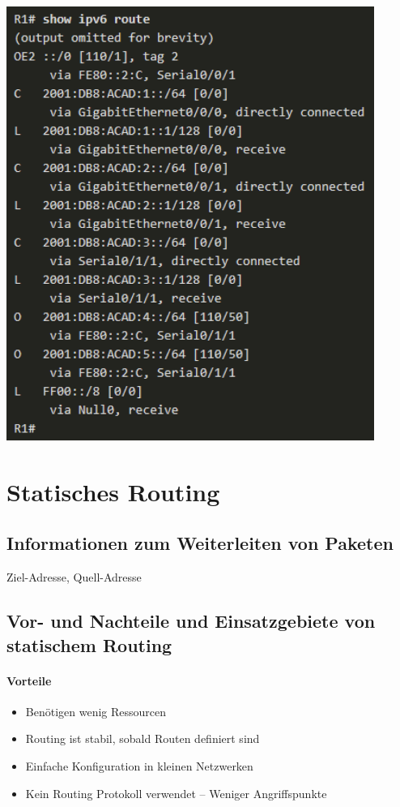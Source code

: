 \documentclass[a4paper,12pt]{article}
\begin{document}
\begin{center}
\includegraphics[width=12cm]{img/11_ipv6_route.png}
\end{center}



\section{Statisches Routing}

\subsection{Informationen zum Weiterleiten von Paketen}
Ziel-Adresse, Quell-Adresse

\subsection{Vor- und Nachteile und Einsatzgebiete von statischem Routing}

\paragraph{Vorteile}
\begin{itemize}
\item Benötigen wenig Ressourcen
\item Routing ist stabil, sobald Routen definiert sind
\item Einfache Konfiguration in kleinen Netzwerken
\item Kein Routing Protokoll verwendet -- Weniger Angriffspunkte
\end{itemize}
\end{document}

